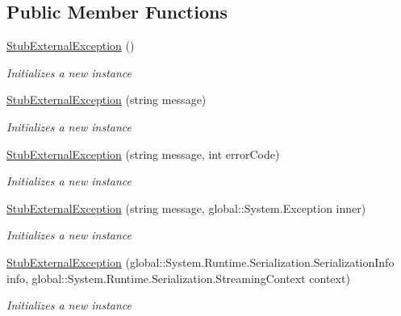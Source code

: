 \subsection*{Public Member Functions}
\begin{DoxyCompactItemize}
\item 
\hyperlink{class_system_1_1_runtime_1_1_interop_services_1_1_fakes_1_1_stub_external_exception_ab3d68a364e6ab525f84f145ed0d84c39}{Stub\-External\-Exception} ()
\begin{DoxyCompactList}\small\item\em Initializes a new instance\end{DoxyCompactList}\item 
\hyperlink{class_system_1_1_runtime_1_1_interop_services_1_1_fakes_1_1_stub_external_exception_a0db5106e563e2d68ae8dd91fcc0ad974}{Stub\-External\-Exception} (string message)
\begin{DoxyCompactList}\small\item\em Initializes a new instance\end{DoxyCompactList}\item 
\hyperlink{class_system_1_1_runtime_1_1_interop_services_1_1_fakes_1_1_stub_external_exception_aa133617cc1a9e592d8caf0e5a3d7d1e8}{Stub\-External\-Exception} (string message, int error\-Code)
\begin{DoxyCompactList}\small\item\em Initializes a new instance\end{DoxyCompactList}\item 
\hyperlink{class_system_1_1_runtime_1_1_interop_services_1_1_fakes_1_1_stub_external_exception_a0571e9aa6cf579423999fd0e302c6524}{Stub\-External\-Exception} (string message, global\-::\-System.\-Exception inner)
\begin{DoxyCompactList}\small\item\em Initializes a new instance\end{DoxyCompactList}\item 
\hyperlink{class_system_1_1_runtime_1_1_interop_services_1_1_fakes_1_1_stub_external_exception_aec1fae53cc1c0717b0f9c6e714eb1b33}{Stub\-External\-Exception} (global\-::\-System.\-Runtime.\-Serialization.\-Serialization\-Info info, global\-::\-System.\-Runtime.\-Serialization.\-Streaming\-Context context)
\begin{DoxyCompactList}\small\item\em Initializes a new instance\end{DoxyCompactList}\item 

\end{DoxyCompactItemize}
